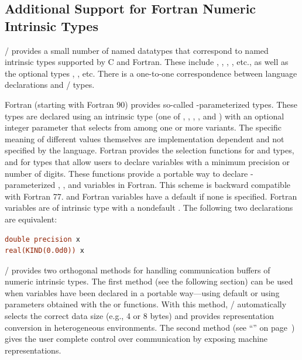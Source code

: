 \subsection{Additional Support for Fortran Numeric Intrinsic Types}
\label{f90:types}

\MPI/
provides a small number of named datatypes that correspond to
named intrinsic types supported by C and Fortran. These include
, , ,
, etc., as well as the optional types
, , etc.  There is a one-to-one
correspondence between language declarations and \MPI/ types.

Fortran (starting with Fortran 90) provides so-called -parameterized
types. These types are declared using an intrinsic type (one of
, , , , and
) with an optional integer
 parameter that selects from among one or more variants.
The specific meaning of different  values themselves are
implementation dependent and not specified by the language.
Fortran
provides the  selection functions 
for  and  types, and
 for  types
that allow users to declare variables
with a minimum precision or number of digits. These functions provide
a portable way to declare -parameterized ,
, and  variables in Fortran.
This scheme is backward compatible with Fortran 77.  and
 Fortran variables have a default  if none
is specified. Fortran  variables are of
intrinsic type  with a nondefault . The following
two declarations are equivalent:
\begin{lstlisting}[language=Fortran]
double precision x
real(KIND(0.0d0)) x
\end{lstlisting}

\MPI/ provides two orthogonal methods for handling communication
buffers of
numeric intrinsic types. The first method
(see the following section)
can be used when
variables have been declared in a portable way---using
default  or using  parameters obtained with
the  or 
functions. With this method, \MPI/ automatically
selects the correct data size (e.g., 4 or 8 bytes) and
provides representation conversion in heterogeneous
environments.  The second method
(see ``''
on page~\pageref{subsubsec:sizespecific})
gives the user complete
control over communication by exposing machine representations.


